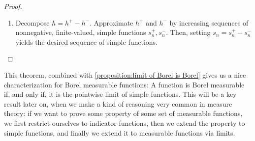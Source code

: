 \begin{proof}
\begin{enumerate}
		\begin{itemize}
			\item If \(h(\omega)\geq n+1\), then
\(s_n(\omega)=n\leq n+1=s_{n+1}(\omega)\). This inequality holds for any
\(N(n)\).
			\item If \(n\leq h(\omega) < n+1\), then \(s_n(\omega)=n\) and there
exists some \(k'\) such that \(h(\omega)\in V^{n+1}_{k'}\). This implies that
\(n\leq h(\omega)<\frac{k'}{N(n+1)}\), from which one can deduce that
\(k'>nN(n+1)\), hence \(k'-1\geq nN(n+1)\). Thus,
			\[s_{n+1}(\omega)=\frac{k'-1}{N(n+1)}\geq\frac{nN(n+1)}{N(n+1)}=n=s_{n}(\omega).\]
This inequality holds for any value \(N(n)\) too.
			\item If \(0\leq h(\omega)<n\), then
\(h(\omega)\in V_k^n\cap V_{k'}^{n+1}\) for some \(k,k'\). This implies that
			\[\frac{k-1}{N(n)}\leq h(\omega)<\frac{k'}{N(n+1)},\] from which one
deduces the inequality \(k'>\frac{N(n+1)}{N(n)}\left(k-1\right)\). If we impose
\(\frac{N(n+1)}{N(n)}\) to be a positive integer, it follows that
\(k'-1\geq\frac{N(n+1)}{N(n)}\left(k-1\right).\) Therefore,
			\[s_{n+1}(\omega)=\frac{k'-1}{N(n+1)}\geq\frac{k-1}{N(n)}=s_n(\omega).\]
		\end{itemize}
		
		So far, the only conditions imposed to \(N(n)\) have been that
\(\frac{N(n+1)}{N(n)}\) is a positive integer and that \(\lim_nN(n)=+\infty\).
There are infinitely many ways to do this, but the easiest one is by setting
\(N(n)=2^n\).\footnote{The exposition of this proof is original. A much more \emph{straight-to-the-point} proof is found in \cite{ash1972real}.}
		\item Decompose \(h=h^+-h^-\). Approximate \(h^+\) and \(h^-\) by
increasing sequences of nonnegative, finite-valued, simple functions
\(s_n^+,s_n^-\). Then, setting \(s_n=s_n^+-s_n^-\) yields the desired sequence
of simple functions.
	\end{enumerate}
\end{proof}

This theorem, combined with
\cref{proposition:limit of Borel is Borel} gives us a nice characterization for
Borel measurable functions:  A function is Borel measurable if, and only if, it
is the pointwise limit of simple functions.  This will be a key result later on,
when we make a kind of reasoning very common in measure theory:  if we want to
prove some property of some set of measurable functions, we first restrict
ourselves  to indicator functions, then we extend the property to simple
functions, and finally
we extend it to measurable functions via limits. 

